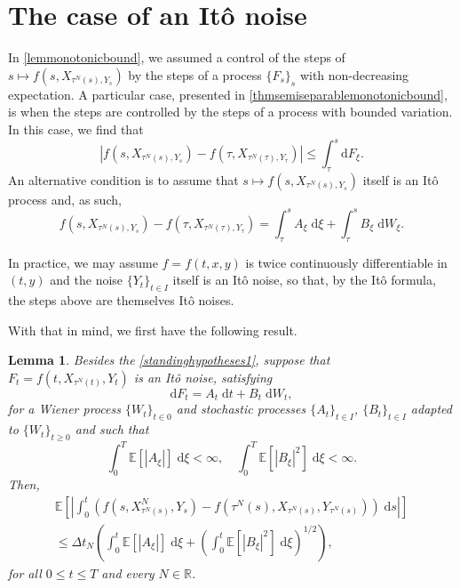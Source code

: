 \documentclass[reqno,12pt]{amsart}
\theoremstyle{plain}%
\newtheorem{lem}{Lemma}[section]
\theoremstyle{definition}
\begin{document}
\section{The case of an It\^o noise}

In \cref{lemmonotonicbound}, we assumed a control of the steps of $s \mapsto f(s, X_{\tau^N(s), Y_s})$ by the steps of a process $\{F_s\}_s$ with non-decreasing expectation. A particular case, presented in \cref{thmsemiseparablemonotonicbound}, is when the steps are controlled by the steps of a process with bounded variation. In this case, we find that
\[
    |f(s, X_{\tau^N(s), Y_s}) - f(\tau, X_{\tau^N(\tau), Y_\tau})| \leq \int_\tau^s \mathrm{d}F_\xi.
\]
An alternative condition is to assume that $s \mapsto f(s, X_{\tau^N(s), Y_s})$ itself is an It\^o process and, as such,
\[
    f(s, X_{\tau^N(s), Y_s}) - f(\tau, X_{\tau^N(\tau), Y_\tau}) = \int_\tau^s A_\xi \;\mathrm{d}\xi + \int_\tau^s B_\xi \;\mathrm{d}W_\xi.
\]

In practice, we may assume $f=f(t, x, y)$ is twice continuously differentiable in $(t, y)$ and the noise $\{Y_t\}_{t\in I}$ itself is an It\^o noise, so that, by the It\^o formula, the steps above are themselves It\^o noises.

With that in mind, we first have the following result.
\begin{lem}
    \label{lemItostep}
    Besides the \cref{standinghypotheses1}, suppose that $F_t = f(t, X_{\tau^N(t)}, Y_t)$ is an It\^o noise, satisfying
    \begin{equation}
        \label{Itostep}
        \mathrm{d}F_t = A_t\;\mathrm{d}t + B_t\;\mathrm{d}W_t,
    \end{equation}
    for a Wiener process $\{W_t\}_{t\in 0}$ and stochastic processes $\{A_t\}_{t\in I}$, $\{B_t\}_{t\in I}$ adapted to $\{W_t\}_{t\geq 0}$ and such that
    \begin{equation}
        \label{expectItostepterms}
        \int_0^T \mathbb{E}[|A_\xi|] \;\mathrm{d}\xi < \infty, \quad \int_0^T \mathbb{E}[|B_\xi|^2] \;\mathrm{d}\xi < \infty.
    \end{equation}
    Then,
    \begin{multline}
        \label{expectintfboundbyIto}
        \mathbb{E}\left[\left|\int_0^t \left(f(s, X_{\tau^N(s)}^N, Y_s) - f(\tau^N(s), X_{\tau^N(s)}, Y_{\tau^N(s)})\right)\;\mathrm{d}s\right|\right]  \\
        \leq \Delta t_N \left(\int_0^t \mathbb{E}[|A_\xi|] \;\mathrm{d}\xi + \left(\int_0^t \mathbb{E}[|B_\xi|^2] \;\mathrm{d}\xi \right)^{1/2}\right),
    \end{multline}
    for all $0 \leq t \leq T$ and every $N\in \mathbb{R}$.
\end{lem}
\end{document}
